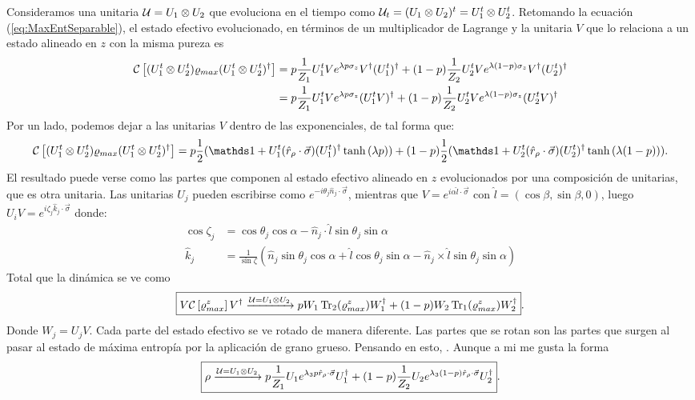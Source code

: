 Consideramos una unitaria $\mathcal{U}=U_{1}\otimes U_{2}$ que evoluciona en el tiempo como $\mathcal{U}_{t}=(U_{1}\otimes U_{2})^{t}=U_{1}^{t}\otimes U_{2}^{t}$. Retomando la ecuación (\ref{eq:MaxEntSeparable}), el estado efectivo evolucionado, en términos de un multiplicador de Lagrange y la unitaria $V$ que lo relaciona a un estado alineado en $z$ con la misma pureza es
\begin{align*}
    \mathcal{C}\left[(U_{1}^{t}\otimes U_{2}^{t})\varrho_{max}(U_{1}^{t}\otimes U_{2}^{t})^{\dag}\right]&=p\frac{1}{Z_{1}}U_{1}^{t}V e^{\lambda p \sigma_{z}}V^{\dag}(U_{1}^t)^{\dag}+(1-p)\frac{1}{Z_{2}}U_{2}^{t}Ve^{\lambda (1-p)\sigma_{z}}V^{\dag}(U_{2}^t)^{\dag}\\
    &=p\frac{1}{Z_{1}}U_{1}^{t}V e^{\lambda p \sigma_{z}}(U_{1}^tV)^{\dag}+(1-p)\frac{1}{Z_{2}}U_{2}^{t}Ve^{\lambda (1-p)\sigma_{z}}(U_{2}^tV)^{\dag}\\
\end{align*}
Por un lado, podemos dejar a las unitarias $V$ dentro de las exponenciales, de tal forma que:
\begin{equation}
    \CG{(U_{1}^{t}\otimes U_{2}^{t})\varrho_{max}(U_{1}^{t}\otimes U_{2}^{t})^{\dag}}=p\frac{1}{2}(\Id+U_{1}^{t}(\hat{r}_{\rho}\cdot\vec{\sigma})(U_{1}^{t})^{\dag}\tanh{(\lambda p)})+(1-p)\frac{1}{2}(\Id+U_{2}^{t}(\hat{r}_{\rho}\cdot\vec{\sigma})(U_{2}^{t})^{\dag}\tanh{(\lambda (1-p))}).
\end{equation}
El resultado puede verse como las partes que componen al estado efectivo alineado en $z$ evolucionados por una composición de unitarias, que es otra unitaria. Las unitarias $U_{j}$ pueden escribirse como $e^{-i\theta_{j} \hat{n}_{j}\cdot\vec{\sigma}}$, mientras que $V=e^{i\alpha\hat{l}\cdot\vec{\sigma}}$ con $\hat{l}=(\cos{\beta},\sin{\beta},0)$, luego $U_{i}V=e^{i\zeta_{j} \hat{k}_{j}\cdot \vec{\sigma}}$ donde:
\begin{align*}
    \cos{\zeta_{j} }&=\cos{\theta_{j}}\cos{\alpha}-\hat{n}_{j}\cdot \hat{l}\sin{\theta_{j}}\sin{\alpha}\\
    \hat{k}_{j} &=\frac{1}{\sin{\zeta}}(\hat{n}_{j}\sin{\theta_{j}}\cos{\alpha}+\hat{l}\cos{\theta_{j}}\sin{\alpha}-\hat{n}_{j}\times \hat{l}\sin{\theta_{j}}\sin{\alpha})
\end{align*}
Total que la dinámica se ve como
\begin{equation}
    \boxed{V\mathcal{C}\left[\varrho_{max}^{z}\right]V^{\dag} \xrightarrow{\mathcal{U}=U_{1}\otimes U_{2}} pW_{1}\Tr_{2}(\varrho_{max}^{z})W_{1}^{\dag}+(1-p)W_{2}\Tr_{1}(\varrho_{max}^{z})W_{2}^{\dag}}.
\end{equation}
Donde $W_{j}=U_{j}V$. Cada parte del estado efectivo se ve rotado de manera diferente. Las partes que se rotan son las partes que surgen al pasar al estado de máxima entropía por la aplicación de grano grueso. Pensando en esto, . Aunque a mi me gusta la forma
\begin{equation}\label{eq:SeparableDynamics}
    \boxed{\rho\xrightarrow{\mathcal{U}=U_{1}\otimes U_{2}} p\frac{1}{Z_{1}}U_{1}e^{\lambda_{3}p\hat{r}_{\rho}\cdot\vec{\sigma}}U_{1}^{\dag}+(1-p)\frac{1}{Z_{2}}U_{2}e^{\lambda_{3}(1-p)\hat{r}_{\rho}\cdot\vec{\sigma}}U_{2}^{\dag}}.
\end{equation}

